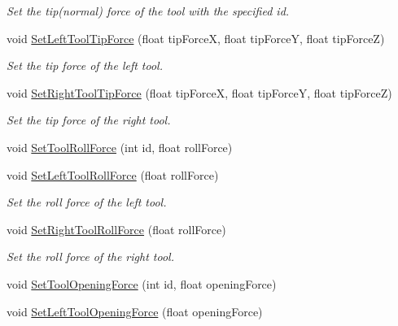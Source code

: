 \begin{DoxyCompactItemize}
\begin{DoxyCompactList}\small\item\em Set the tip(normal) force of the tool with the specified id. \item\end{DoxyCompactList}\item 
\hypertarget{classvtkIHP_a76173618cf6df3c4a051bafbef0ac04e}{
void \hyperlink{classvtkIHP_a76173618cf6df3c4a051bafbef0ac04e}{SetLeftToolTipForce} (float tipForceX, float tipForceY, float tipForceZ)}
\label{classvtkIHP_a76173618cf6df3c4a051bafbef0ac04e}

\begin{DoxyCompactList}\small\item\em Set the tip force of the left tool. \item\end{DoxyCompactList}\item 
\hypertarget{classvtkIHP_a7292bbe4362e4e331c4719f640871cd5}{
void \hyperlink{classvtkIHP_a7292bbe4362e4e331c4719f640871cd5}{SetRightToolTipForce} (float tipForceX, float tipForceY, float tipForceZ)}
\label{classvtkIHP_a7292bbe4362e4e331c4719f640871cd5}

\begin{DoxyCompactList}\small\item\em Set the tip force of the right tool. \item\end{DoxyCompactList}\item 
void \hyperlink{classvtkIHP_a150baa776fc4adb50fb672a15ac00ee5}{SetToolRollForce} (int id, float rollForce)
\item 
\hypertarget{classvtkIHP_aca9aee7af34e194c3479dc382f370a98}{
void \hyperlink{classvtkIHP_aca9aee7af34e194c3479dc382f370a98}{SetLeftToolRollForce} (float rollForce)}
\label{classvtkIHP_aca9aee7af34e194c3479dc382f370a98}

\begin{DoxyCompactList}\small\item\em Set the roll force of the left tool. \item\end{DoxyCompactList}\item 
\hypertarget{classvtkIHP_a83773f3aa0a4aed4d9f55ba666dcb52f}{
void \hyperlink{classvtkIHP_a83773f3aa0a4aed4d9f55ba666dcb52f}{SetRightToolRollForce} (float rollForce)}
\label{classvtkIHP_a83773f3aa0a4aed4d9f55ba666dcb52f}

\begin{DoxyCompactList}\small\item\em Set the roll force of the right tool. \item\end{DoxyCompactList}\item 
void \hyperlink{classvtkIHP_adabfef75bc93fcf73418614a448943ad}{SetToolOpeningForce} (int id, float openingForce)
\item 
\hypertarget{classvtkIHP_acc75db5b10de4eac14ac442b9e6e93e0}{
void \hyperlink{classvtkIHP_acc75db5b10de4eac14ac442b9e6e93e0}{SetLeftToolOpeningForce} (float openingForce)}
\label{classvtkIHP_acc75db5b10de4eac14ac442b9e6e93e0}


\end{DoxyCompactItemize}
